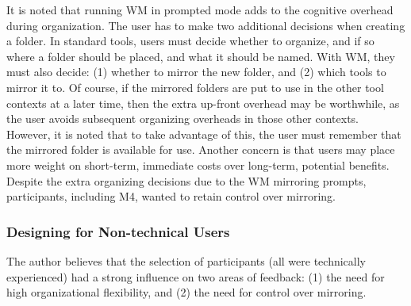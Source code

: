 It is noted that running WM in prompted mode adds to the cognitive overhead during organization.  The user has to make two additional decisions when creating a folder.  In standard tools, users must decide whether to organize, and if so where a folder should be placed, and what it should be named.  With WM, they must also decide: (1) whether to mirror the new folder, and (2) which tools to mirror it to.
Of course, if the mirrored folders are put to use in the other tool contexts at a later time, then the extra up-front overhead may be worthwhile, as the user avoids subsequent organizing overheads in those other contexts.  However, it is noted that to take advantage of this, the user must remember that the mirrored folder is available for use.  Another concern is that users may place more weight on short-term, immediate costs over long-term, potential benefits.
Despite the extra organizing decisions due to the WM mirroring prompts, participants, including M4, wanted to retain control over mirroring.



\subsubsection{Designing for Non-technical Users}

The author believes that the selection of participants (all were technically experienced) had a strong influence on two areas of feedback: (1) the need for high organizational flexibility, and (2) the need for control over mirroring.

